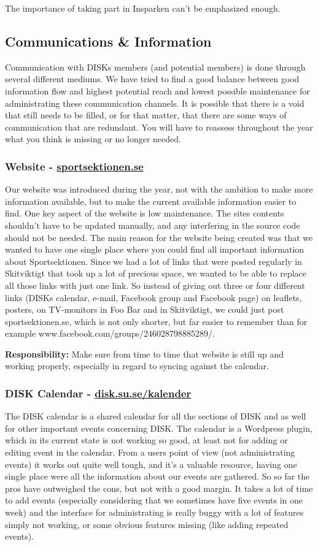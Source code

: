 \documentclass[12pt,a4paper]{article}
\begin{document}
		The importance of taking part in Insparken can't be emphasized enough.
		\subsection{Communications \& Information}
		Communication with DISKs members (and potential members) is done through several different mediums. We have tried to find a good balance between good information flow and highest potential reach and lowest possible maintenance for administrating these communication channels. It is possible that there is a void that still needs to be filled, or for that matter, that there are some ways of communication that are redundant. You will have to reassess throughout the year what you think is missing or no longer needed.
			\subsubsection{Website - \href{http://sportsektionen.se}{sportsektionen.se}}
			Our website was introduced during the year, not with the ambition to make more information available, but to make the current available information easier to find. One key aspect of the website is low maintenance. The sites contents shouldn't have to be updated manually, and any interfering in the source code should not be needed. The main reason for the website being created was that we wanted to have one single place where you could find all important information about Sportsektionen. Since we had a lot of links that were posted regularly in Skitviktigt that took up a lot of precious space, we wanted to be able to replace all those links with just one link. So instead of giving out three or four different links (DISKs calendar, e-mail, Facebook group and Facebook page) on leaflets, posters, on TV-monitors in Foo Bar and in Skitviktigt, we could just post sportsektionen.se, which is not only shorter, but far easier to remember than for example www.facebook.com/groups/246028798885289/.

			\textbf{Responsibility:} Make sure from time to time that website is still up and working properly, especially in regard to syncing against the calendar.
			\subsubsection{DISK Calendar - \href{http://disk.su.se/kalender}{disk.su.se/kalender}}
			The DISK calendar is a shared calendar for all the sections of DISK and as well for other important events concerning DISK. The calendar is a Wordpress plugin, which in its current state is not working so good, at least not for adding or editing event in the calendar. From a users point of view (not administrating events) it works out quite well tough, and it's a valuable resource, having one single place were all the information about our events are gathered. So so far the pros have outweighed the cons, but not with a good margin. It takes a lot of time to add events (especially considering that we sometimes have five events in one week) and the interface for administrating is really buggy with a lot of features simply not working, or some obvious features missing (like adding repeated events).
\end{document}

